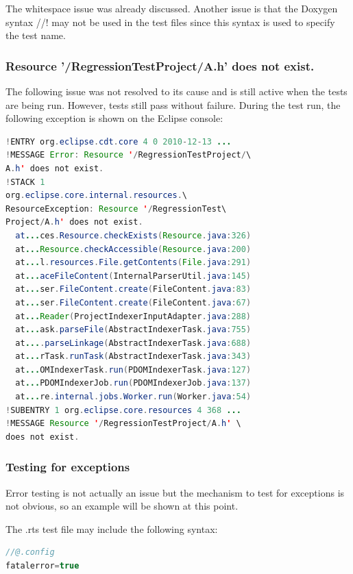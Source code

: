 The whitespace issue was already discussed. Another issue is that the Doxygen 
syntax //! may not be used in the test files since this syntax is used to 
specify the test name.

\subsubsection{Resource '/RegressionTestProject/A.h' does not exist.}

The following issue was not resolved to its cause and is still active when the 
tests are being run. However, tests still pass without failure. During the test 
run, the following exception is shown on the Eclipse console:

\begin{lstlisting}[caption={Randomly appearing error message},language=java]
!ENTRY org.eclipse.cdt.core 4 0 2010-12-13 ...
!MESSAGE Error: Resource '/RegressionTestProject/\
A.h' does not exist.
!STACK 1
org.eclipse.core.internal.resources.\
ResourceException: Resource '/RegressionTest\
Project/A.h' does not exist.
  at...ces.Resource.checkExists(Resource.java:326)
  at...Resource.checkAccessible(Resource.java:200)
  at...l.resources.File.getContents(File.java:291)
  at...aceFileContent(InternalParserUtil.java:145)
  at...ser.FileContent.create(FileContent.java:83)
  at...ser.FileContent.create(FileContent.java:67)
  at...Reader(ProjectIndexerInputAdapter.java:288)
  at...ask.parseFile(AbstractIndexerTask.java:755)
  at....parseLinkage(AbstractIndexerTask.java:688)
  at...rTask.runTask(AbstractIndexerTask.java:343)
  at...OMIndexerTask.run(PDOMIndexerTask.java:127)
  at...PDOMIndexerJob.run(PDOMIndexerJob.java:137)
  at...re.internal.jobs.Worker.run(Worker.java:54)
!SUBENTRY 1 org.eclipse.core.resources 4 368 ...
!MESSAGE Resource '/RegressionTestProject/A.h' \
does not exist.
\end{lstlisting}

\subsubsection{Testing for exceptions}

Error testing is not actually an issue but the mechanism to test for exceptions 
is not obvious, so an example will be shown at this point. 

The .rts test file may include the following syntax:

\begin{lstlisting}[caption={Syntax to set variables inside a .rts file},
language=java]
//@.config
fatalerror=true
\end{lstlisting}

